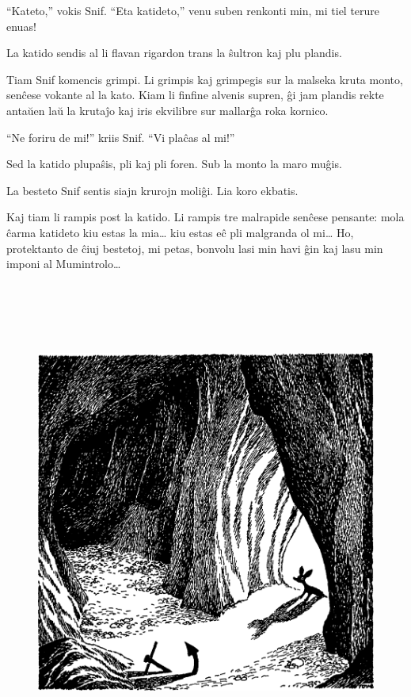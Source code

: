 ``Kateto,'' vokis Snif. ``Eta katideto,'' venu suben renkonti min, mi tiel terure enuas!

La katido sendis al li flavan rigardon trans la ŝultron kaj plu plandis.

Tiam Snif komencis grimpi. Li grimpis kaj grimpegis sur la malseka kruta monto, senĉese vokante al la kato. Kiam li finfine alvenis supren, ĝi jam plandis rekte antaŭen laŭ la krutaĵo kaj iris ekvilibre sur mallarĝa roka kornico.

``Ne foriru de mi!'' kriis Snif. ``Vi plaĉas al mi!''

Sed la katido plupaŝis, pli kaj pli foren. Sub la monto la maro muĝis.

La besteto Snif sentis siajn krurojn moliĝi. Lia koro ekbatis.

Kaj tiam li rampis post la katido. Li rampis tre malrapide senĉese pensante: mola ĉarma katideto kiu estas la mia{\ldots} kiu estas eĉ pli malgranda ol mi{\ldots} Ho, protektanto de ĉiuj bestetoj, mi petas, bonvolu lasi min havi ĝin kaj lasu min imponi al Mumintrolo{\ldots}

\begin{figure}[htbp]
\centering
\includegraphics[width=450pt,height=452pt]{1-7.png}
\caption{}
\label{1-7}
\end{figure}

